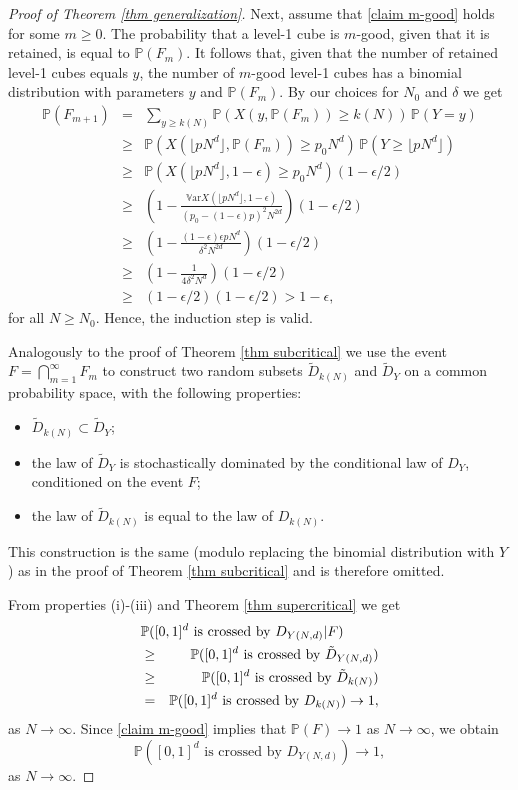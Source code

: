 \documentclass[11pt,a4paper]{article}
\newcommand{\IV}{\ensuremath{\mathbb{V}}}
\newcommand{\IP}{\ensuremath{\mathbb{P}}}
\newcommand{\Var}{\ensuremath{\IV\text{ar}}}
\theoremstyle{remark}
\begin{document}
\begin{proof}[Proof of Theorem \ref{thm generalization}]
Next, assume that \eqref{claim m-good} holds for some $m\geq 0$. The probability that a level-1 cube is $m$-good, given that it is retained, is equal to $\IP(F_m)$. It follows that, given that the number of retained level-1 cubes equals $y$, the number of $m$-good level-1 cubes has a binomial distribution with parameters $y$ and $\IP(F_m)$. By our choices for $N_0$ and $\delta$ we get
\begin{eqnarray*}
 \IP(F_{m+1}) &=& \sum_{y \geq k(N)} \IP(X(y,\IP(F_m)) \geq k(N)) \, \IP(Y = y) \\
& \geq& \IP(X(\lfloor pN^d \rfloor,\IP(F_m)) \geq p_0 N^d) \, \IP(Y \geq \lfloor pN^d \rfloor) \\
&\geq& \IP(X(\lfloor pN^d \rfloor,1-\epsilon)\geq p_0 N^d) (1-\epsilon/2) \\
&\geq& \left(1-\frac{\Var X(\lfloor pN^d \rfloor,1-\epsilon)}{(p_0 - (1-\epsilon)p)^2 N^{2d}}\right)(1-\epsilon/2) \\
&\geq& \left(1-\frac{(1-\epsilon)\epsilon pN^d}{\delta^2 N^{2d}}\right) (1-\epsilon/2) \\
&\geq& \left(1-\frac{1}{4 \delta^2 N^d}\right)(1-\epsilon/2) \\
&\geq& (1-\epsilon/2)(1-\epsilon/2)>1-\epsilon,
\end{eqnarray*}
 for all $N \geq N_0$. Hence, the induction step is valid.


Analogously to the proof of Theorem \ref{thm subcritical} we use the event $F=\bigcap_{m=1}^{\infty} F_m$ to construct two random subsets $\tilde D_{k(N)}$ and $\tilde D_{Y}$ on a common probability space, with the following properties: 
\begin{itemize}
 \item[(i)] $\tilde{D}_{k(N)} \subset \tilde{D}_{Y}$;
\item[(ii)] the law of $\tilde{D}_{Y}$ is stochastically dominated by the conditional law of $D_{Y}$, conditioned on the event $F$;
\item[(iii)] the law of $\tilde D_{k(N)}$ is equal to the law of $D_{k(N)}$.
\end{itemize}
This construction is the same (modulo replacing the binomial distribution with $Y$) as in the proof of Theorem \ref{thm subcritical} and is therefore omitted.


From properties (i)-(iii) and Theorem \ref{thm supercritical} we get
\begin{eqnarray*}
 \lefteqn{\IP([0,1]^d \text{ is crossed by } D_{Y(N,d)} | F) } \\
&\geq& \IP([0,1]^d \text{ is crossed by } \tilde D_{Y(N,d)})  \\
&\geq & \IP([0,1]^d \text{ is crossed by } \tilde D_{k(N)}) \\
&=&\IP([0,1]^d \text{ is crossed by } D_{k(N)}) \to 1,
\end{eqnarray*}
as $N \to \infty$. Since \eqref{claim m-good} implies that $\IP(F) \to 1$ as $N \to \infty$, we obtain
\[
 \IP([0,1]^d \text{ is crossed by } D_{Y(N,d)}) \to 1,
\]
as $N \to \infty$.
\end{proof}
\end{document}
